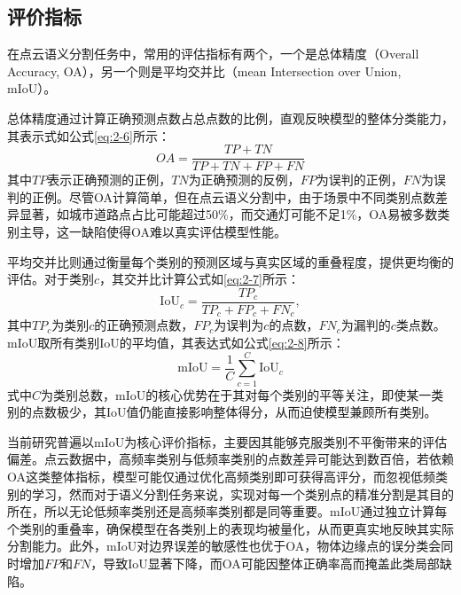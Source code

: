 \subsection{评价指标}
在点云语义分割任务中，常用的评估指标有两个，一个是总体精度（Overall Accuracy, OA），另一个则是平均交并比（mean Intersection over Union, mIoU）。

总体精度通过计算正确预测点数占总点数的比例，直观反映模型的整体分类能力，其表示式如公式\eqref{eq:2-6}所示：
\begin{equation}
    \label{eq:2-6}
    OA = \frac{TP + TN}{TP + TN + FP + FN}
\end{equation}
其中$TP$表示正确预测的正例，$TN$为正确预测的反例，$FP$为误判的正例，$FN$为误判的正例。尽管OA计算简单，但在点云语义分割中，由于场景中不同类别点数差异显著，如城市道路点占比可能超过50\%，而交通灯可能不足1\%，OA易被多数类别主导，这一缺陷使得OA难以真实评估模型性能。

平均交并比则通过衡量每个类别的预测区域与真实区域的重叠程度，提供更均衡的评估。对于类别$c$，其交并比计算公式如\eqref{eq:2-7}所示：
\begin{equation}
    \label{eq:2-7}
    \text{IoU}_c = \frac{TP_c}{TP_c + FP_c + FN_c},
\end{equation}
其中$TP_c$为类别$c$的正确预测点数，$FP_c$为误判为$c$的点数，$FN_c$为漏判的$c$类点数。mIoU取所有类别IoU的平均值，其表达式如公式\eqref{eq:2-8}所示：
\begin{equation}
    \label{eq:2-8}
    \text{mIoU} = \frac{1}{C} \sum_{c=1}^C \text{IoU}_c
\end{equation}
式中$C$为类别总数，mIoU的核心优势在于其对每个类别的平等关注，即使某一类别的点数极少，其IoU值仍能直接影响整体得分，从而迫使模型兼顾所有类别。

当前研究普遍以mIoU为核心评价指标，主要因其能够克服类别不平衡带来的评估偏差。点云数据中，高频率类别与低频率类别的点数差异可能达到数百倍，若依赖OA这类整体指标，模型可能仅通过优化高频类别即可获得高评分，而忽视低频类别的学习，然而对于语义分割任务来说，实现对每一个类别点的精准分割是其目的所在，所以无论低频率类别还是高频率类别都是同等重要。mIoU通过独立计算每个类别的重叠率，确保模型在各类别上的表现均被量化，从而更真实地反映其实际分割能力。此外，mIoU对边界误差的敏感性也优于OA，物体边缘点的误分类会同时增加$FP$和$FN$，导致IoU显著下降，而OA可能因整体正确率高而掩盖此类局部缺陷。%
